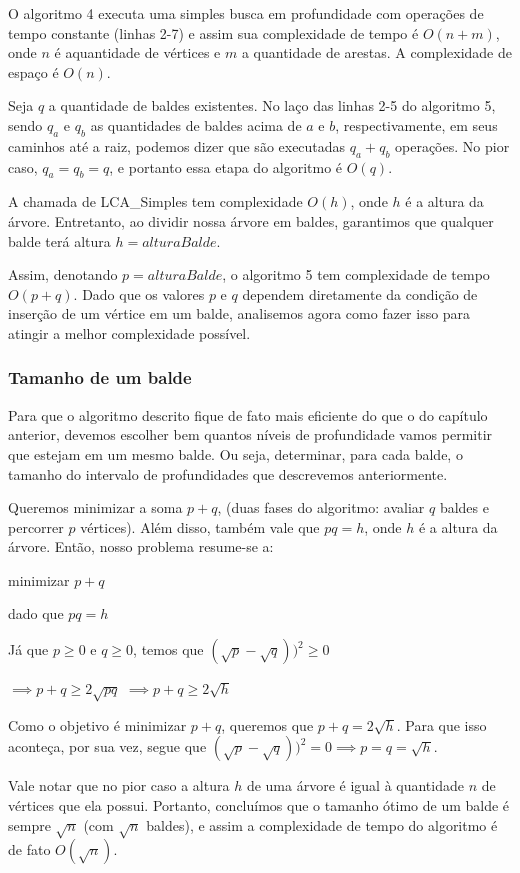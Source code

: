 O algoritmo 4 executa uma simples busca em profundidade com operações de tempo constante (linhas 2-7) e assim sua complexidade de tempo é $O(n+m)$, onde $n$ é aquantidade de vértices e $m$ a quantidade de arestas. A complexidade de espaço é $O(n)$.

Seja $q$ a quantidade de baldes existentes. No laço das linhas 2-5 do algoritmo 5, sendo $q_a$ e $q_b$ as quantidades de baldes acima de $a$ e $b$, respectivamente, em seus caminhos até a raiz, podemos dizer que são executadas $q_a + q_b$ operações. No pior caso, $q_a = q_b = q$, e portanto essa etapa do algoritmo é $O(q)$.

A chamada de LCA\_Simples tem complexidade $O(h)$, onde $h$ é a altura da árvore. Entretanto, ao dividir nossa árvore em baldes, garantimos que qualquer balde terá altura $h = alturaBalde$.

Assim, denotando $p = alturaBalde$, o algoritmo 5 tem complexidade de tempo $O(p + q)$. Dado que os valores $p$ e $q$ dependem diretamente da condição de inserção de um vértice em um balde, analisemos agora como fazer isso para atingir a melhor complexidade possível.

\subsubsection{Tamanho de um balde}

Para que o algoritmo descrito fique de fato mais eficiente do que o do capítulo anterior, devemos escolher bem quantos níveis de profundidade vamos permitir que estejam em um mesmo balde. Ou seja, determinar, para cada balde, o tamanho do intervalo de profundidades que descrevemos anteriormente.

Queremos minimizar a soma $p + q$, (duas fases do algoritmo: avaliar $q$ baldes e percorrer $p$ vértices). Além disso, também vale que $pq = h$, onde $h$ é a altura da árvore. Então, nosso problema resume-se a:

\centerline{minimizar $p + q$}
\centerline{dado que $pq = h$}

\hspace{1cm}

Já que $p \geq 0$ e $q \geq 0$, temos que $(\sqrt{p} - \sqrt{q}))^2 \geq 0$

$\implies p + q \geq 2\sqrt{pq}$
$\implies p + q \geq 2\sqrt{h}$

\hspace{1cm}

Como o objetivo é minimizar $p + q$, queremos que $p + q = 2\sqrt{h}$. Para que isso aconteça, por sua vez, segue que $(\sqrt{p} - \sqrt{q}))^2 = 0 \implies p = q = \sqrt{h}$.

\hspace{1cm}

Vale notar que no pior caso a altura $h$ de uma árvore é igual à quantidade $n$ de vértices que ela possui. Portanto, concluímos que o tamanho ótimo de um balde é sempre $\sqrt{n}$ (com $\sqrt{n}$ baldes), e assim a complexidade de tempo do algoritmo é de fato $O(\sqrt{n})$.

